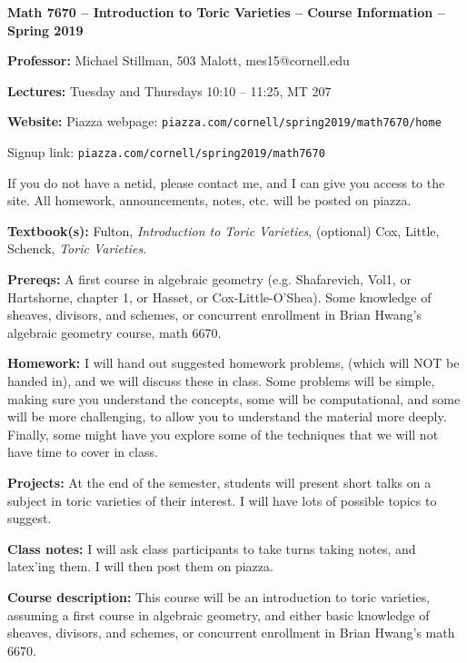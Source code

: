 \documentclass[11pt]{article}
\begin{document}
\hspace{1cm} {\bf Math 7670 -- Introduction to Toric Varieties -- Course Information -- Spring 2019}

\bigskip
\noindent
    {\bf Professor:}
    Michael Stillman, 503 Malott, mes15@cornell.edu

\smallskip
\noindent
    {\bf Lectures:}
    Tuesday and Thursdays 10:10 -- 11:25, MT 207

\smallskip
\noindent
    {\bf Website:}
    Piazza webpage: {\tt piazza.com/cornell/spring2019/math7670/home}

    Signup link: {\tt piazza.com/cornell/spring2019/math7670}

    If you do not have a netid, please contact me, and I can give you access to the site.
    All homework, announcements, notes, etc. will be posted on piazza.

    \medskip
\noindent
    {\bf Textbook(s):}
    Fulton, {\it Introduction to Toric Varieties}, 
    (optional) Cox, Little, Schenck, {\it Toric Varieties}.

\medskip
\noindent
    {\bf Prereqs:}
A first course in algebraic geometry (e.g. Shafarevich, Vol1,
or Hartshorne, chapter 1, or Hasset, or Cox-Little-O'Shea).  Some
knowledge of sheaves, divisors, and schemes, or concurrent enrollment
in Brian Hwang's algebraic geometry course, math 6670.


\medskip
\noindent
    {\bf Homework:}
I will hand out suggested homework problems, (which will NOT
be handed in), and we will discuss these in class.  Some problems will
be simple, making sure you understand the concepts, some will be
computational, and some will be more challenging, to allow you to
understand the material more deeply.  Finally, some might have you
explore some of the techniques that we will not have time to cover in
class.

\medskip
\noindent
    {\bf Projects:}
At the end of the semester, students will present short
talks on a subject in toric varieties of their interest.  I will have
lots of possible topics to suggest.

\medskip
\noindent
    {\bf Class notes:}
I will ask class participants to take turns taking notes, and
latex'ing them.  I will then post them on piazza.

\medskip
\noindent
    {\bf Course description:}
This course will be an introduction to toric varieties, assuming a
first course in algebraic geometry, and either basic knowledge of
sheaves, divisors, and schemes, or concurrent enrollment in Brian
Hwang's math 6670.
\end{document}
